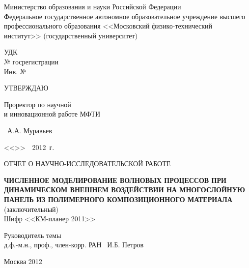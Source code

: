 \begin{titlepage}
\newpage

\begin{center}
Министерство образования и науки Российской Федерации\\
Федеральное государственное автономное образовательное учреждение высшего профессионального образования <<Московский физико-технический институт>> (государственный университет)\\
\end{center}

\vspace{0.5em}

\noindent
\begin{minipage}[t]{0.5\textwidth}
УДК\\
№ госрегистрации\\
Инв. №
\end{minipage}
\begin{minipage}[t]{0.5\textwidth}
\centering УТВЕРЖДАЮ
\begin{flushleft}
Проректор по научной \\
и инновационной работе МФТИ
\end{flushleft}
\begin{flushright}
\hrulefill ~А.А. Муравьев
\end{flushright}
\begin{flushright}
<<\underline{\hspace{10 mm}}>>\ \hrulefill\ 2012~г.
\end{flushright}
\end{minipage}

\vspace{2em}

\begin{center}
ОТЧЕТ О НАУЧНО-ИССЛЕДОВАТЕЛЬСКОЙ РАБОТЕ
\end{center}

\vspace{0.5em}

\begin{center}
\textsc{\textbf{ЧИСЛЕННОЕ МОДЕЛИРОВАНИЕ ВОЛНОВЫХ ПРОЦЕССОВ ПРИ ДИНАМИЧЕСКОМ ВНЕШНЕМ ВОЗДЕЙСТВИИ НА МНОГОСЛОЙНУЮ ПАНЕЛЬ ИЗ ПОЛИМЕРНОГО КОМПОЗИЦИОННОГО МАТЕРИАЛА}} \\
(заключительный) \\
Шифр <<КМ-планер 2011>>
\end{center}

\vspace{2em}

\begin{flushleft}
\vspace{1.5em}
Руководитель темы \\
д.ф.-м.н., проф., член-корр. РАН \hrulefill ~И.Б. Петров
\end{flushleft}

\vspace{\fill}
\begin{center}
Москва 2012
\end{center}

\end{titlepage}
